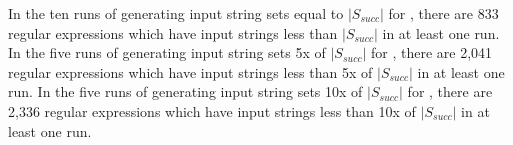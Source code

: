 In the ten runs of generating input string sets equal to $\lvert S_{succ} \rvert$ for \RexSOne, there are 833 regular expressions %
which have input strings less than $\lvert S_{succ} \rvert$ in at least one run. 
In the five runs of generating input string sets 5x of $\lvert S_{succ} \rvert$ for \RexSFive, there are 2,041 regular expressions %
which have input strings less than 5x of $\lvert S_{succ} \rvert$ in at least one run. In the five runs of generating input string sets 10x of $\lvert S_{succ} \rvert$ for \RexSTen, there are 2,336 regular expressions %
which have input strings less than 10x of $\lvert S_{succ} \rvert$ in at least one run.




